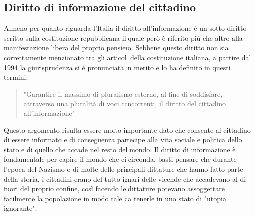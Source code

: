 \documentclass{article}
\begin{document}
\subsection{Diritto di informazione del cittadino}
Almeno per quanto riguarda l'Italia il diritto all'informazione è un sotto-diritto scritto sulla costituzione repubblicana il quale però è riferito più che altro alla manifestazione libera del proprio pensiero.
Sebbene questo diritto non sia correttamente menzionato tra gli articoli della costituzione italiana, a partire dal 1994 la giurisprudenza si è pronunciata in merito e lo ha definito in questi termini:
\begin{quote}
    "Garantire il massimo di pluralismo esterno, al fine di soddisfare, attraverso una pluralità di voci concorrenti, il diritto del cittadino all'informazione"
\end{quote}
Questo argomento risulta essere molto importante dato che consente al cittadino di essere informato e di conseguenza partecipe alla vita sociale e politica dello stato e di quello che accade nel resto del mondo.
Il diritto di informazione è fondamentale per capire il mondo che ci circonda, basti pensare che durante l'epoca del Nazismo o di molte delle principali dittature che hanno fatto parte della storia, i cittadini erano del tutto ignari delle vicende che accadevano al di fuori del proprio confine, così facendo le dittature potevano assoggettare facilmente la popolazione in modo tale da tenerle in uno stato di "utopia ignorante".
\end{document}
